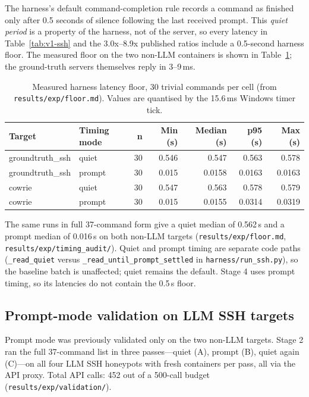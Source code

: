 \documentclass[a4paper,11pt]{article}
\begin{document}
The harness's default command-completion rule records a command as finished
only after 0.5 seconds of silence following the last received prompt. This
\emph{quiet period} is a property of the harness, not of the server, so every
latency in Table~\ref{tab:v1-ssh} and the 3.0x--8.9x published ratios include a
0.5-second harness floor. The measured floor on the two non-LLM containers is
shown in Table~\ref{tab:floor}; the ground-truth servers themselves reply in
3--9\,ms.

\begin{table}[ht]
\centering
\caption{Measured harness latency floor, 30 trivial commands per cell (from
\texttt{results/exp/floor.md}). Values are quantised by the 15.6\,ms Windows
timer tick.}
\label{tab:floor}
\scriptsize
\begin{tabularx}{\textwidth}{l l r r r r r}
\toprule
Target & Timing mode & n & Min (s) & Median (s) & p95 (s) & Max (s) \\
\midrule
groundtruth\_ssh & quiet & 30 & 0.546 & 0.547 & 0.563 & 0.578 \\
groundtruth\_ssh & prompt & 30 & 0.015 & 0.0158 & 0.0163 & 0.0163 \\
cowrie & quiet & 30 & 0.547 & 0.563 & 0.578 & 0.579 \\
cowrie & prompt & 30 & 0.015 & 0.0155 & 0.0314 & 0.0319 \\
\bottomrule
\end{tabularx}
\end{table}

The same runs in full 37-command form give a quiet median of 0.562\,s and a
prompt median of 0.016\,s on both non-LLM targets
(\texttt{results/exp/floor.md}, \texttt{results/exp/timing\_audit/}). Quiet and
prompt timing are separate code paths (\texttt{\_read\_quiet} versus
\texttt{\_read\_until\_prompt\_settled} in \texttt{harness/run\_ssh.py}), so the
baseline batch is unaffected; quiet remains the default. Stage 4 uses prompt
timing, so its latencies do not contain the 0.5\,s floor.

\subsection{Prompt-mode validation on LLM SSH targets}
\label{sec:prompt-val}

Prompt mode was previously validated only on the two non-LLM targets. Stage 2
ran the full 37-command list in three passes---quiet (A), prompt (B), quiet
again (C)---on all four LLM SSH honeypots with fresh containers per pass, all
via the API proxy. Total API calls: 452 out of a 500-call budget
(\texttt{results/exp/validation/}).
\end{document}
